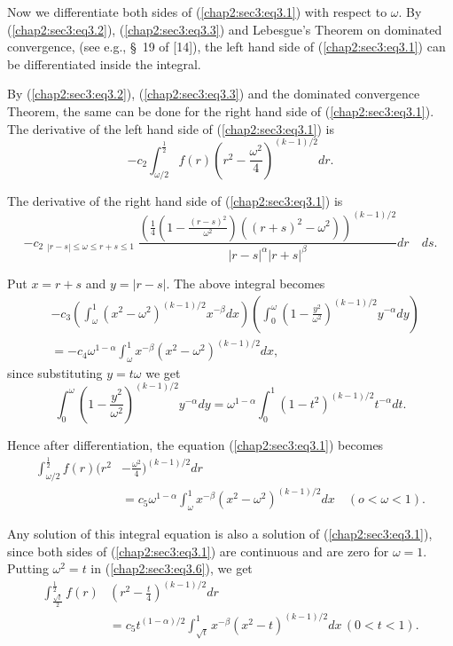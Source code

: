Now we differentiate both sides of (\ref{chap2:sec3:eq3.1}) with respect to $\omega$. By (\ref{chap2:sec3:eq3.2}), (\ref{chap2:sec3:eq3.3}) and Lebesgue's Theorem on dominated convergence, (see e.g., \S\ 19 of [14]), the left hand side of (\ref{chap2:sec3:eq3.1}) can be differentiated inside the integral. 

By (\ref{chap2:sec3:eq3.2}), (\ref{chap2:sec3:eq3.3}) and the dominated convergence Theorem, the same can be done for the right hand side of (\ref{chap2:sec3:eq3.1}). The derivative of the left hand side of (\ref{chap2:sec3:eq3.1}) is
\begin{equation*}
-c_{2} \int_{\omega/2}^{\frac{1}{2}} f(r) (r^{2} - \frac{\omega^{2}}{4})^{(k-1)/2} dr.\tag{3.5}\label{chap2:sec3:eq3.5}
\end{equation*}

The derivative of the right hand side of (\ref{chap2:sec3:eq3.1}) is
$$
-c_{2} \mathop{\int_{0}^{1} \int_{0}^{1}}_{|r-s| \leq \omega \leq r+s \leq 1} \frac{\left(\frac{1}{4}\left(1 - \frac{(r-s)^{2}}{\omega^{2}}\right) ((r+s)^{2} - \omega^{2})\right)^{(k-1)/2}}{|r-s|^{\alpha} |r+s|^{\beta}} dr \quad ds.
$$

Put $x = r+s$ and $y = |r-s|$. The above integral becomes
\begin{align*}
& -c_{3} \left(\int_{\omega}^{1} (x^{2} - \omega^{2})^{(k-1)/2} x^{-\beta} dx\right) \left(\int_{0}^{\omega} (1 - \frac{y^{2}}{\omega^{2}})^{(k-1)/2} y^{-\alpha} dy\right)\\
& = -c_{4} \omega^{1-\alpha} \int_{\omega}^{1} x^{-\beta} (x^{2} - \omega^{2})^{(k-1)/2} dx,
\end{align*}
since substituting $y = t \omega$ we get
$$
\int_{0}^{\omega} \left(1 - \frac{y^{2}}{\omega^{2}}\right)^{(k-1)/2} y^{-\alpha} dy = \omega^{1 - \alpha} \int_{0}^{1} (1 - t^{2})^{(k-1)/2} t^{-\alpha} dt.
$$

Hence after differentiation, the equation (\ref{chap2:sec3:eq3.1}) becomes
\begin{align*}
\int_{\omega/2}^{\frac{1}{2}} f(r)(r^{2} & - \frac{\omega^{2}}{4})^{(k-1)/2} dr\\ 
& = c_{5} \omega^{1- \alpha} \int_{\omega}^{1} x^{-\beta} (x^{2} - \omega^{2})^{(k-1)/2} dx \quad(o < \omega < 1).\tag{3.6}\label{chap2:sec3:eq3.6}
\end{align*}\pageoriginale

Any solution of this integral equation is also a solution of (\ref{chap2:sec3:eq3.1}), since both sides of (\ref{chap2:sec3:eq3.1}) are continuous and are zero for $\omega = 1$. Putting $\omega^{2} = t$ in (\ref{chap2:sec3:eq3.6}), we get
\begin{align*}
\int_{\frac{\sqrt{t}}{2}}^{\frac{1}{2}} f(r)& \left(r^{2}  - \frac{t}{4}\right)^{(k-1)/2} dr\\ 
& = c_{5} t^{(1-\alpha)/2} \int_{\sqrt{t}}^{1} x^{-\beta} (x^{2} - t)^{(k-1)/2} dx\, (0 < t < 1).\tag{3.7}\label{chap2:sec3:eq3.7}
\end{align*}

